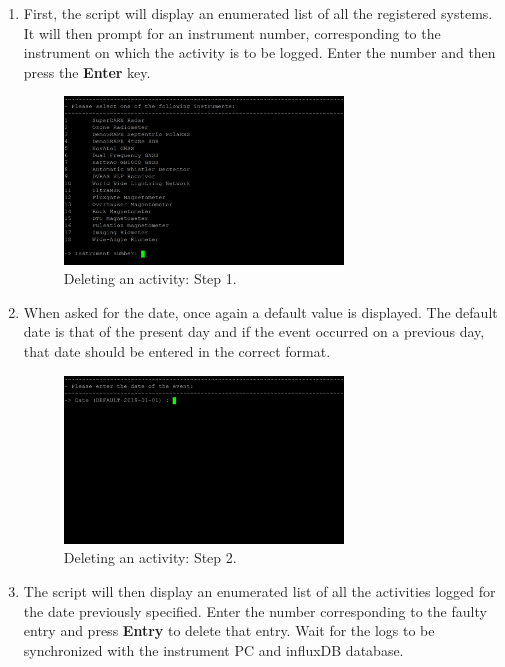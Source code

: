 \begin{enumerate}
	\item First, the script will display an enumerated list of all the registered systems. It will then prompt for an instrument number, corresponding to the instrument on which the activity is to be logged. Enter the number and then press the \textbf{Enter} key.
		\begin{figure}[H]
			\centering
			\includegraphics[width=0.7\textwidth]{images/operations/delete_1.jpg}
			\caption{Deleting an activity: Step 1.}
			\label{fig:ops_del1}
		\end{figure}
	\item When asked for the date, once again a default value is displayed. The default date is that of the present day and if the event occurred on a previous day, that date should be entered in the correct format.
		\begin{figure}[H]
			\centering
			\includegraphics[width=0.7\textwidth]{images/operations/delete_2.jpg}
			\caption{Deleting an activity: Step 2.}
			\label{fig:ops_del2}
		\end{figure}
	\newpage
	\item The script will then display an enumerated list of all the activities logged for the date previously specified. Enter the number corresponding to the faulty entry and press \textbf{Entry} to delete that entry. Wait for the logs to be synchronized with the instrument PC and influxDB database.

\end{enumerate}
